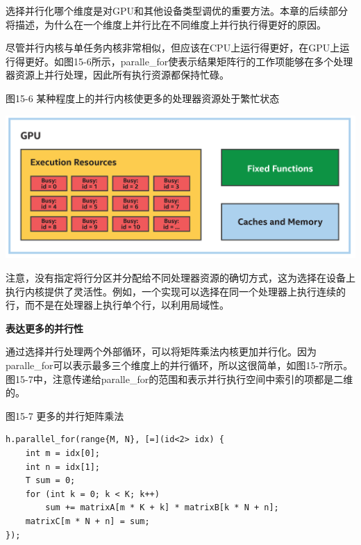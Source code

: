 \begin{tcolorbox}[colback=blue!5!white,colframe=blue!75!black, title=选择如何并行化]
选择并行化哪个维度是对GPU和其他设备类型调优的重要方法。本章的后续部分将描述，为什么在一个维度上并行比在不同维度上并行执行得更好的原因。
\end{tcolorbox}

尽管并行内核与单任务内核非常相似，但应该在CPU上运行得更好，在GPU上运行得更好。如图15-6所示，paralle\_for使表示结果矩阵行的工作项能够在多个处理器资源上并行处理，因此所有执行资源都保持忙碌。\par

\hspace*{\fill} \par %
图15-6 某种程度上的并行内核使更多的处理器资源处于繁忙状态
\begin{center}
	\includegraphics[width=1.0\textwidth]{content/chapter-15/images/5}
\end{center}

注意，没有指定将行分区并分配给不同处理器资源的确切方式，这为选择在设备上执行内核提供了灵活性。例如，一个实现可以选择在同一个处理器上执行连续的行，而不是在处理器上执行单个行，以利用局域性。\par

\hspace*{\fill} \par %
\textbf{表达更多的并行性}

通过选择并行处理两个外部循环，可以将矩阵乘法内核更加并行化。因为paralle\_for可以表示最多三个维度上的并行循环，所以这很简单，如图15-7所示。图15-7中，注意传递给paralle\_for的范围和表示并行执行空间中索引的项都是二维的。\par

\hspace*{\fill} \par %
图15-7 更多的并行矩阵乘法
\begin{lstlisting}[caption={}]
h.parallel_for(range{M, N}, [=](id<2> idx) {
	int m = idx[0];
	int n = idx[1];
	T sum = 0;
	for (int k = 0; k < K; k++)
		sum += matrixA[m * K + k] * matrixB[k * N + n];
	matrixC[m * N + n] = sum;
});
\end{lstlisting}

